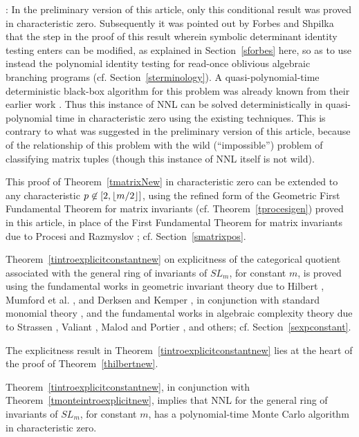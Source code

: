 \documentclass[11pt]{article}
\begin{document}
:  In the preliminary version 
\cite{GCT5focs} of this article, only this conditional result was proved in characteristic zero.
Subsequently it was pointed out by Forbes and Shpilka  \cite{fs3}  that 
the step in the proof of this result wherein 
symbolic determinant identity testing  enters  can be  modified,
as  explained in  Section~\ref{sforbes} here, so as to use 
instead the polynomial identity testing for read-once oblivious algebraic branching 
programs (cf. Section~\ref{sterminology}). 
A quasi-polynomial-time deterministic black-box algorithm  for this  problem was  already known from their
earlier work \cite{fs2}. Thus 
this instance of NNL can be solved  deterministically in quasi-polynomial time
in  characteristic zero  using the existing techniques. This is contrary to what was suggested in 
the preliminary version \cite{GCT5focs} of this article, 
because of the  relationship of this problem
with the  wild (``impossible'') problem \cite{drozd} 
of classifying matrix tuples (though  this instance of NNL itself is not wild).

This proof of Theorem~\ref{tmatrixNew} in characteristic zero can be extended to any 
characteristic $p \not \in [2,{\lfloor m/2 \rfloor}]$,  using
the  refined form 
of the Geometric First Fundamental Theorem for matrix invariants (cf. Theorem~\ref{tprocesigen}) proved in this article,
in place of the First Fundamental Theorem for matrix invariants due to Procesi and Razmyslov \cite{procesimatrix,razmyslov}; 
cf. Section~\ref{smatrixpos}.



Theorem~\ref{tintroexplicitconstantnew} on explicitness of the categorical quotient associated with 
the general ring of invariants of $SL_m$, for constant $m$, is proved 
using  the fundamental works in geometric invariant theory due to Hilbert
\cite{hilbert}, Mumford et al. \cite{mumford}, and Derksen and Kemper \cite{derksen,derksenbook}, 
in conjunction with standard monomial theory \cite{raghavan},
and the fundamental works  in algebraic complexity theory
due to Strassen \cite{strassen}, Valiant \cite{valiant2}, Malod and Portier \cite{malod}, and others; cf. Section~\ref{sexpconstant}.

The explicitness result in Theorem~\ref{tintroexplicitconstantnew} lies at the heart 
of  the proof of Theorem~\ref{thilbertnew}.

Theorem~\ref{tintroexplicitconstantnew}, in conjunction with Theorem~\ref{tmonteintroexplicitnew}, implies that 
NNL for the general ring of invariants of $SL_m$, for constant $m$, has a  polynomial-time Monte Carlo algorithm
in characteristic zero.
\end{document}
